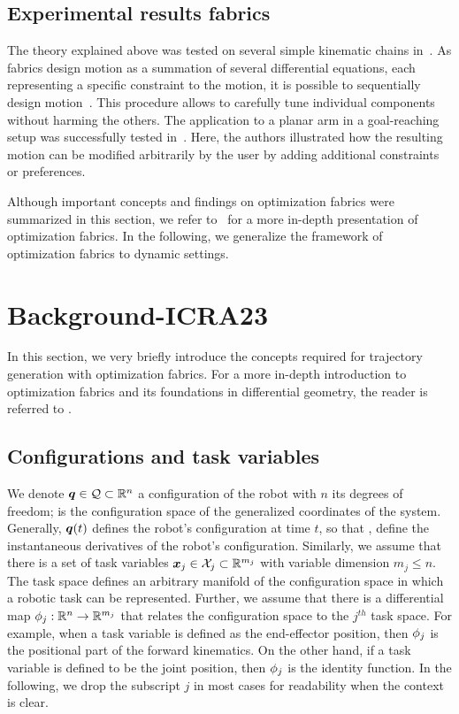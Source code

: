 \subsection{Experimental results fabrics}%
\label{sub:experimental_results_fabrics}

The theory explained above was tested on several simple kinematic chains
in~\cite{Ratliff2020,Ratliff2021}. As fabrics design motion as a summation of several
differential equations, each representing a specific constraint to the motion, it is
possible to sequentially design motion~\cite{Ratliff2020}. This procedure allows to
carefully tune individual components without harming the others. The application to a
planar arm in a goal-reaching setup was successfully tested in~\cite{Ratliff2020}. Here,
the authors illustrated how the resulting motion can be modified arbitrarily by the user
by adding additional constraints or preferences.

Although important concepts and findings on optimization fabrics were summarized in this
section, we refer to~\cite{Ratliff2020} for a more in-depth presentation of optimization
fabrics. In the following, we generalize the framework of optimization fabrics to dynamic settings.

\section{Background-ICRA23}
\label{sec:optimization_fabrics}
%
In this section, we very briefly introduce the concepts required for trajectory
generation with optimization fabrics. For a more in-depth introduction to
optimization fabrics and its foundations in differential geometry, the reader
is referred to \cite{Ratliff2020,Spahn2022,Wyk2022}.
%
\subsection{Configurations and task variables}%
\label{sub:configurations_and_task_variables}
%
We denote $\bm{q}\in\mathcal{Q}\subset\mathbb{R}^n$ a
configuration of the robot with $n$ its degrees of freedom;
\Q{} is the configuration space of the generalized coordinates
of the system. Generally, $\bm{q}(t)$ defines the robot's configuration at time $t$, so that 
\qdot, \qddot{} define the instantaneous derivatives of the robot's configuration.
Similarly, we assume
that there is a set of task variables $\bm{x}_j\in\mathcal{X}_j\subset\mathbb{R}^{m_j}$ with variable dimension
$m_j \leq n$. The task space \Xj{} defines an arbitrary manifold of the configuration
space \Q{} in which a robotic task can be represented. 
Further, we assume that there is a differential map
$\phi_j:\mathbb{R}^n\rightarrow\mathbb{R}^{m_j}$ that relates the configuration space to the $j^{th}$ task
space. For example, when a task variable is defined as the end-effector position, then
$\phi_j$ is the positional part of the forward kinematics. On the other hand, if a task
variable is defined to be the joint position, then $\phi_j$ is the identity function. 
In the following, we drop the subscript $j$ in most cases for readability when the
context is clear.

